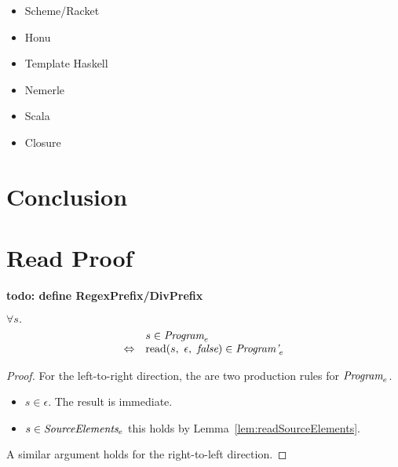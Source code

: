 \documentclass[preprint,10pt]{sigplanconf}
\begin{document}
\begin{itemize}
\item Scheme/Racket
\item Honu
\item Template Haskell
\item Nemerle \cite{Skalski2004}
\item Scala
\item Closure
\end{itemize}
\section{Conclusion}




\appendix

\clearpage

\section{Read Proof}

\textbf{todo: define RegexPrefix/DivPrefix}



\begin{theorem}\mbox{}

  \( \forall s. \)
  \[
  \begin{array}{rl}
  &s \in \textit{Program}_{e} \\
  \Leftrightarrow&
  \textrm{read}(s,~\epsilon,~\textit{false}) \in \textit{Program'}_{e}
  \end{array}
  \]
\end{theorem}
\begin{proof}

  For the left-to-right direction, the are two production rules for 
  \( \textit{Program}_{e} \).
  \begin{itemize}
  \item \( s \in \epsilon \). The result is immediate.

  \item \( s \in \textit{SourceElements}_{e} \)
    this holds by Lemma~\ref{lem:readSourceElements}.
  \end{itemize}

  A similar argument holds for the right-to-left direction.
\end{proof}
\end{document}
